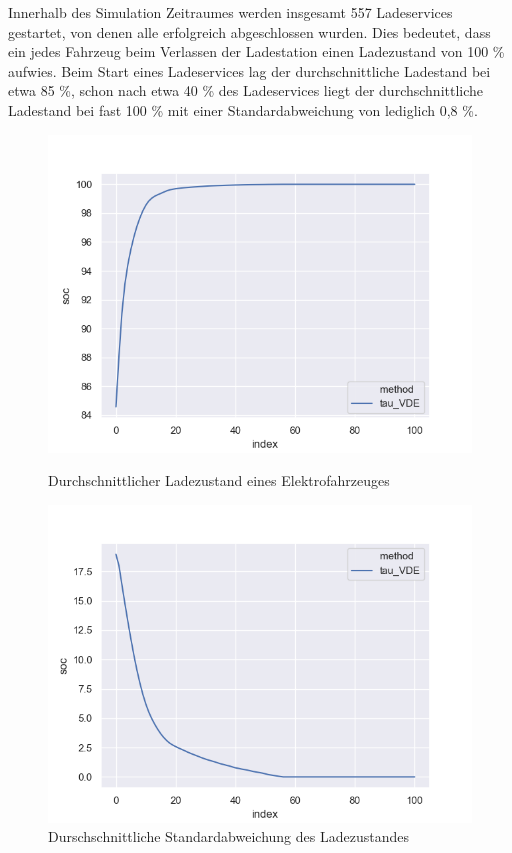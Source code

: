 Innerhalb des Simulation Zeitraumes werden insgesamt 557 Ladeservices gestartet, von denen alle erfolgreich abgeschlossen wurden. Dies bedeutet, dass ein jedes Fahrzeug beim Verlassen der Ladestation einen Ladezustand von 100 \% aufwies. Beim Start eines Ladeservices lag der durchschnittliche Ladestand bei etwa 85 \%, schon nach etwa 40 \% des Ladeservices liegt der durchschnittliche Ladestand bei fast 100 \% mit einer Standardabweichung von lediglich 0,8 \%. 
\begin{figure}[htb]
	\centering
	\begin{minipage}[t]{0.49\linewidth}
		\centering
        \includegraphics[width=\linewidth]{img/VDE_tau/tau_VDE_2_soc_mean.png}
        \caption{Durchschnittlicher Ladezustand eines Elektrofahrzeuges}
        \label{ABB_VDEtauSocMEAN}
	\end{minipage}
	\hfill
	\begin{minipage}[t]{0.49\linewidth}
		\centering
        \includegraphics[width=\linewidth]{img/VDE_tau/tau_VDE_2_soc_std.png}
        \caption{Durschschnittliche Standardabweichung des Ladezustandes}
        \label{ABB_VDEtauSocSTD}
	\end{minipage}
\end{figure}

